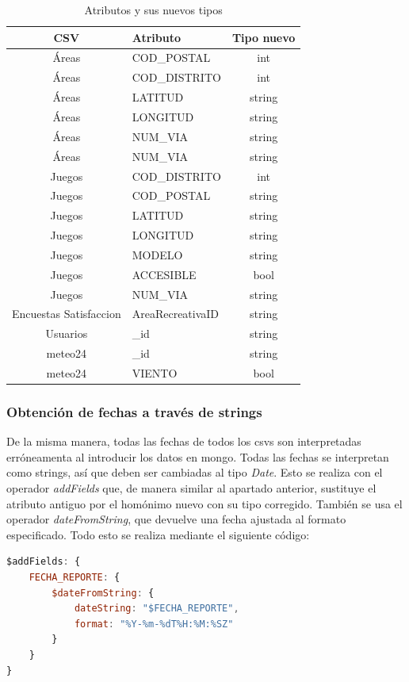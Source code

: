 \documentclass[]{article}
\begin{document}
\begin{table}[H]
    \centering
    \begin{tabular}{| c | l | c |}
        \hline
        CSV & Atributo & Tipo nuevo \\ \hline 
        Áreas & COD\_POSTAL & int\\ 
        Áreas & COD\_DISTRITO & int\\ 
        Áreas & LATITUD & string\\ 
        Áreas & LONGITUD & string\\
        Áreas & NUM\_VIA & string\\ 
        Áreas & NUM\_VIA & string\\ 
        Juegos & COD\_DISTRITO & int\\ 
        Juegos & COD\_POSTAL & string\\ 
        Juegos & LATITUD & string\\ 
        Juegos & LONGITUD & string\\
        Juegos & MODELO & string\\ 
        Juegos & ACCESIBLE & bool\\ 
        Juegos & NUM\_VIA & string\\ 
        Encuestas Satisfaccion & AreaRecreativaID & string\\ 
        Usuarios & \_id & string\\ 
        meteo24 & \_id & string\\ 
        meteo24 & VIENTO & bool\\
        \hline
    \end{tabular}
    \caption{Atributos y sus nuevos tipos}
\end{table}

\subsubsection{Obtención de fechas a través de strings}
De la misma manera, todas las fechas de todos los csvs son interpretadas erróneamenta al introducir los datos en mongo. Todas las fechas se interpretan como strings, así que deben ser cambiadas al tipo \textit{Date}. Esto se realiza con el operador \textit{addFields} que, de manera similar al apartado anterior, sustituye el atributo antiguo por el homónimo nuevo con su tipo corregido. También se usa el operador \textit{dateFromString}, que devuelve una fecha ajustada al formato especificado. Todo esto se realiza mediante el siguiente código:

\begin{lstlisting}[language=JavaScript, caption=Cambio a date de las fechas]
$addFields: {
    FECHA_REPORTE: {
        $dateFromString: {
            dateString: "$FECHA_REPORTE",
            format: "%Y-%m-%dT%H:%M:%SZ"
        }
    }
}
\end{lstlisting}
\end{document}
